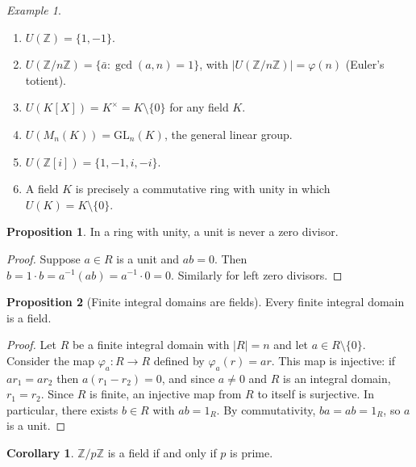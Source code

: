 \documentclass[12pt,a4paper,openany]{book}
\theoremstyle{definition}
\newtheorem{proposition}{Proposition}[chapter]
\newtheorem{corollary}{Corollary}[chapter]
\theoremstyle{remark}
\newtheorem{example}{Example}[chapter]
\renewcommand{\gcd}{\operatorname{gcd}}
\begin{document}
\begin{example}\label{ex:units}
\begin{enumerate}[label=(\alph*)]
    \item $U(\mathbb{Z})=\{1,-1\}$.
    \item $U(\mathbb{Z}/n\mathbb{Z})=\{\bar{a} : \gcd(a,n)=1\}$, with $|U(\mathbb{Z}/n\mathbb{Z})|=\varphi(n)$ (Euler's totient).
    \item $U(K[X])=K^{\times}=K\setminus\{0\}$ for any field $K$.
    \item $U(M_n(K))=\mathrm{GL}_n(K)$, the general linear group.
    \item $U(\mathbb{Z}[i])=\{1,-1,i,-i\}$.
    \item A field $K$ is precisely a commutative ring with unity in which $U(K)=K\setminus\{0\}$.
\end{enumerate}
\end{example}

\begin{proposition}\label{prop:unit-not-zerodiv}
In a ring with unity, a unit is never a zero divisor.
\end{proposition}

\begin{proof}
Suppose $a\in R$ is a unit and $ab=0$. Then $b=1\cdot b=a^{-1}(ab)=a^{-1}\cdot 0=0$. Similarly for left zero divisors.
\end{proof}

\begin{proposition}[Finite integral domains are fields]\label{prop:finite-domain-field}
Every finite integral domain is a field.
\end{proposition}

\begin{proof}
Let $R$ be a finite integral domain with $|R|=n$ and let $a\in R\setminus\{0\}$. Consider the map $\varphi_a\colon R\to R$ defined by $\varphi_a(r)=ar$. This map is injective: if $ar_1=ar_2$ then $a(r_1-r_2)=0$, and since $a\neq 0$ and $R$ is an integral domain, $r_1=r_2$. Since $R$ is finite, an injective map from $R$ to itself is surjective. In particular, there exists $b\in R$ with $ab=1_R$. By commutativity, $ba=ab=1_R$, so $a$ is a unit.
\end{proof}

\begin{corollary}\label{cor:Zp-field}
$\mathbb{Z}/p\mathbb{Z}$ is a field if and only if $p$ is prime.
\end{corollary}
\end{document}
